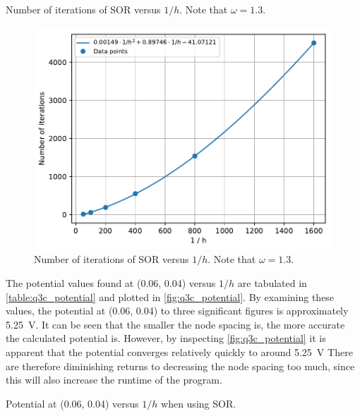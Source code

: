 \documentclass[a4paper,titlepage]{article}
\begin{document}
	\begin{table}[!htb]
		\centering
		\caption{Number of iterations of SOR versus $1/h$. Note that $\omega=1.3$.}
		\label{table:q3c_iterations}
	\end{table}
	
	\begin{figure}[!htb]
		\centering
		\includegraphics[width=\columnwidth]{plots/q3c_iterations.pdf}
		\caption
		{Number of iterations of SOR versus $1/h$. Note that $\omega=1.3$.}
		\label{fig:q3c_iterations}
	\end{figure}

	The potential values found at (0.06, 0.04) versus $1/h$ are tabulated in \autoref{table:q3c_potential} and plotted in \autoref{fig:q3c_potential}. By examining these values, the potential at (0.06, 0.04) to three significant figures is approximately \SI{5.25}{\volt}. It can be seen that the smaller the node spacing is, the more accurate the calculated potential is. However, by inspecting \autoref{fig:q3c_potential} it is apparent that the potential converges relatively quickly to around \SI{5.25}{\volt} There are therefore diminishing returns to decreasing the node spacing too much, since this will also increase the runtime of the program.

	\begin{table}[!htb]
		\centering
		\caption{Potential at (0.06, 0.04) versus $1/h$ when using SOR.}
		\label{table:q3c_potential}
	\end{table}
\end{document}
